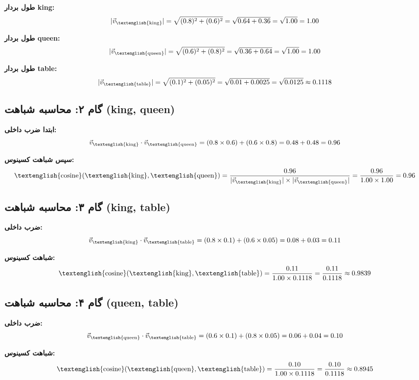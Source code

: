 \documentclass[11pt,a4paper]{article}
\newcommand{\en}[1]{\textenglish{#1}}
\begin{document}
\noindent\textbf{طول بردار \en{king}:}
\[
|\vec{v}_{\text{\en{king}}}| = \sqrt{(0.8)^2 + (0.6)^2} = \sqrt{0.64 + 0.36} = \sqrt{1.00} = 1.00
\]

\noindent\textbf{طول بردار \en{queen}:}
\[
|\vec{v}_{\text{\en{queen}}}| = \sqrt{(0.6)^2 + (0.8)^2} = \sqrt{0.36 + 0.64} = \sqrt{1.00} = 1.00
\]

\noindent\textbf{طول بردار \en{table}:}
\[
|\vec{v}_{\text{\en{table}}}| = \sqrt{(0.1)^2 + (0.05)^2} = \sqrt{0.01 + 0.0025} = \sqrt{0.0125} \approx 0.1118
\]

\subsection{گام ۲: محاسبه شباهت (\en{king}, \en{queen})}

\noindent\textbf{ابتدا ضرب داخلی:}
\[
\vec{v}_{\text{\en{king}}} \cdot \vec{v}_{\text{\en{queen}}} = (0.8 \times 0.6) + (0.6 \times 0.8) = 0.48 + 0.48 = 0.96
\]

\noindent\textbf{سپس شباهت کسینوس:}
\[
\text{\en{cosine}}(\text{\en{king}}, \text{\en{queen}}) = \frac{0.96}{|\vec{v}_{\text{\en{king}}}| \times |\vec{v}_{\text{\en{queen}}}|} = \frac{0.96}{1.00 \times 1.00} = 0.96
\]

\subsection{گام ۳: محاسبه شباهت (\en{king}, \en{table})}

\noindent\textbf{ضرب داخلی:}
\[
\vec{v}_{\text{\en{king}}} \cdot \vec{v}_{\text{\en{table}}} = (0.8 \times 0.1) + (0.6 \times 0.05) = 0.08 + 0.03 = 0.11
\]

\noindent\textbf{شباهت کسینوس:}
\[
\text{\en{cosine}}(\text{\en{king}}, \text{\en{table}}) = \frac{0.11}{1.00 \times 0.1118} = \frac{0.11}{0.1118} \approx 0.9839
\]

\subsection{گام ۴: محاسبه شباهت (\en{queen}, \en{table})}

\noindent\textbf{ضرب داخلی:}
\[
\vec{v}_{\text{\en{queen}}} \cdot \vec{v}_{\text{\en{table}}} = (0.6 \times 0.1) + (0.8 \times 0.05) = 0.06 + 0.04 = 0.10
\]

\noindent\textbf{شباهت کسینوس:}
\[
\text{\en{cosine}}(\text{\en{queen}}, \text{\en{table}}) = \frac{0.10}{1.00 \times 0.1118} = \frac{0.10}{0.1118} \approx 0.8945
\]
\end{document}
